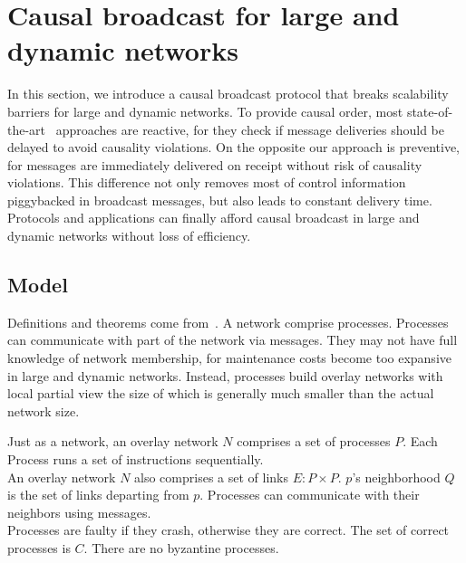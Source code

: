 
\section{Causal broadcast for large and dynamic networks}
\label{sec:proposal}

In this section, we introduce a causal broadcast protocol that breaks
scalability barriers for large and dynamic networks. 
To provide causal order, most
state-of-the-art~\cite{almeida2008interval,birman1987reliable,fidge1988timestamps,hadzilacos1993fault,mattern1989virtual,mostefaoui2017probabilistic,singhal1992efficient}
approaches are reactive, for they check if message deliveries should be delayed
to avoid causality violations. On the opposite our approach is preventive, for
messages are immediately delivered on receipt without risk of causality
violations. This difference not only removes most of control information
piggybacked in broadcast messages, but also leads to constant delivery
time. Protocols and applications can finally afford causal broadcast in large
and dynamic networks without loss of efficiency.


\subsection{Model}

Definitions and theorems come from~\cite{hadzilacos1994modular}. A network
comprise processes. Processes can communicate with part of the network via
messages. They may not have full knowledge of network membership, for
maintenance costs become too expansive in large and dynamic networks. Instead,
processes build overlay networks with local partial view the size of which is
generally much smaller than the actual network size.

\begin{definition}
  Just as a network, an overlay network $N$ comprises a set of processes
  $P$. Each Process runs a
  set of instructions sequentially. \\
  An overlay network $N$ also comprises a set of links $E: P \times P$. $p$'s
  neighborhood $Q$ is the set of links departing from $p$. Processes can
  communicate with their neighbors using messages. \\
  Processes are faulty if they crash, otherwise they are correct. The set of
  correct processes is $C$. There are no byzantine processes.
\end{definition}

